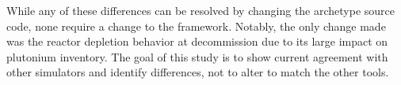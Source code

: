 While any of these differences can be resolved by changing the \Cycamore
archetype source code, none require a change to the \Cyclus framework. Notably, 
        the only change made was the \Cycamore reactor
depletion behavior at decommission due to its large impact on plutonium inventory.
The goal of this
study is to show current \Cyclus agreement with other simulators and identify
differences, not to alter \Cyclus to match the other tools.
